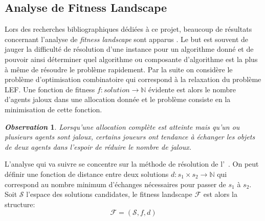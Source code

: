 \documentclass[a4paper, 11pt]{article}
\newtheorem{observation}{\it\bfseries Observation}
\begin{document}
	\subsection{Analyse de Fitness Landscape}
	Lors des recherches bibliographiques dédiées à ce projet, beaucoup de résultats concernant l'analyse de \textit{fitness landscape} sont apparus \cite{?, ?}. Le but est souvent de jauger la difficulté de résolution d'une instance pour un algorithme donné et de pouvoir ainsi déterminer quel algorithme ou composante d'algorithme est la plus à même de résoudre le problème rapidement. Par la suite on considère le problème d'optimisation combinatoire qui correspond à la relaxation du problème \textsc{LEF}. Une fonction de fitness $f : solution \rightarrow \mathbb{N}$ évidente est alors le nombre d'agents jaloux dans une allocation donnée et le problème consiste en la minimisation de cette fonction. 
	
	\begin{observation}
	\label{obs-swap}
	Lorsqu'une allocation complète est atteinte mais qu'un ou plusieurs agents sont jaloux, certains joueurs ont tendance à échanger les objets de deux agents dans l'espoir de réduire le nombre de jaloux.
	\end{observation}
	
	L'analyse qui va suivre se concentre sur la méthode de résolution de l'~. On peut définir une fonction de distance entre deux solutions $d : s_1 \times s_2 \rightarrow \mathbb{N}$ qui correspond au nombre minimum d'échanges nécessaires pour passer de $s_1$ à $s_2$. Soit $\mathcal{S}$ l'espace des solutions candidates, le fitness landscape $\mathcal{F}$ est alors la structure:
	\begin{equation*}
	    \mathcal{F} = (\mathcal{S}, f, d)
	\end{equation*}
	
\end{document}
